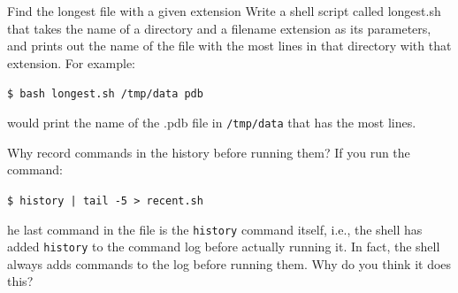 \documentclass{beamer}
\begin{document}

\begin{frame}{Find the longest file with a given extension}
Write a shell script called longest.sh that takes the name of a directory and a filename extension as its parameters, and prints out the name of the file with the most lines in that directory with that extension. For example:
\vspace{0.5cm}


\begin{beamerboxesrounded}[upper=uppercolgreen,lower=lowercolgreen,shadow=false]{}
\small{\texttt{\$ bash longest.sh /tmp/data pdb}}
\end{beamerboxesrounded}

\vspace{0.5cm}

would print the name of the .pdb file in \texttt{/tmp/data} that has the most lines.
\end{frame}


\begin{frame}{Why record commands in the history before running them?}
If you run the command:

\vspace{0.5cm}


\begin{beamerboxesrounded}[upper=uppercolgreen,lower=lowercolgreen,shadow=false]{}
\small{\texttt{\$ history | tail -5 > recent.sh}}
\end{beamerboxesrounded}

\vspace{0.5cm}

he last command in the file is the \texttt{history} command itself, i.e., the shell has added \texttt{history} to the command log before actually running it. In fact, the shell always adds commands to the log before running them. Why do you think it does this?
\end{frame}


\end{document}
